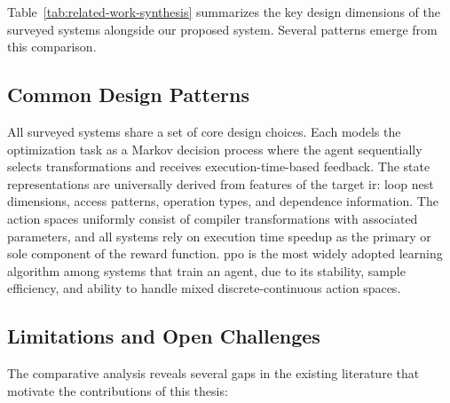 Table~\ref{tab:related-work-synthesis} summarizes the key design dimensions of the surveyed systems alongside our proposed system. Several patterns emerge from this comparison.

\subsection{Common Design Patterns}

All surveyed systems share a set of core design choices. Each models the optimization task as a Markov decision process where the agent sequentially selects transformations and receives execution-time-based feedback. The state representations are universally derived from features of the target \gls{ir}: loop nest dimensions, access patterns, operation types, and dependence information. The action spaces uniformly consist of compiler transformations with associated parameters, and all systems rely on execution time speedup as the primary or sole component of the reward function. \gls{ppo} is the most widely adopted learning algorithm among systems that train an agent, due to its stability, sample efficiency, and ability to handle mixed discrete-continuous action spaces.

\subsection{Limitations and Open Challenges}

The comparative analysis reveals several gaps in the existing literature that motivate the contributions of this thesis:

